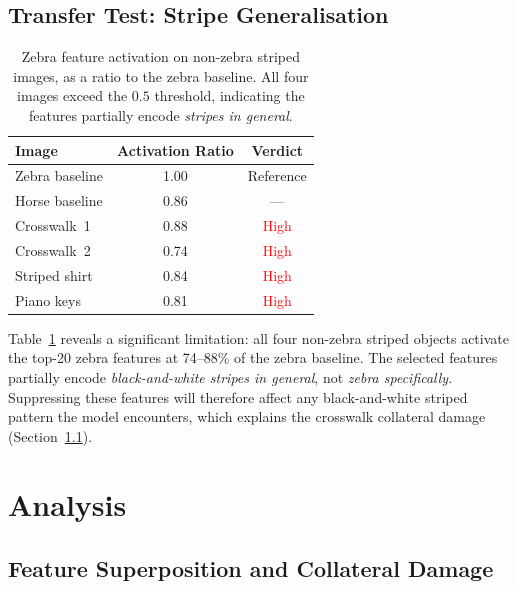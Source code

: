 \documentclass{article}
\begin{document}
\subsection{Transfer Test: Stripe Generalisation}

\begin{table}[ht]
\caption{Zebra feature activation on non-zebra striped images, as a
         ratio to the zebra baseline. All four images exceed the
         $0.5$ threshold, indicating the features partially encode
         \emph{stripes in general}.}
\label{tab:transfer}
\vskip 0.15in
\begin{center}
\begin{small}
\begin{tabular}{lcc}
\toprule
\textbf{Image} & \textbf{Activation Ratio} & \textbf{Verdict} \\
\midrule
Zebra baseline   & 1.00 & Reference \\
Horse baseline   & 0.86 & --- \\
Crosswalk~1      & 0.88 & \textcolor{red}{High} \\
Crosswalk~2      & 0.74 & \textcolor{red}{High} \\
Striped shirt    & 0.84 & \textcolor{red}{High} \\
Piano keys       & 0.81 & \textcolor{red}{High} \\
\bottomrule
\end{tabular}
\end{small}
\end{center}
\vskip -0.1in
\end{table}

Table~\ref{tab:transfer} reveals a significant limitation: all four
non-zebra striped objects activate the top-20 zebra features at
74--88\% of the zebra baseline. The selected features partially encode
\emph{black-and-white stripes in general}, not \emph{zebra
specifically}. Suppressing these features will therefore affect any
black-and-white striped pattern the model encounters, which explains
the crosswalk collateral damage (Section~\ref{sec:superposition}).

\section{Analysis}
\label{sec:analysis}

\subsection{Feature Superposition and Collateral Damage}
\label{sec:superposition}
\end{document}
